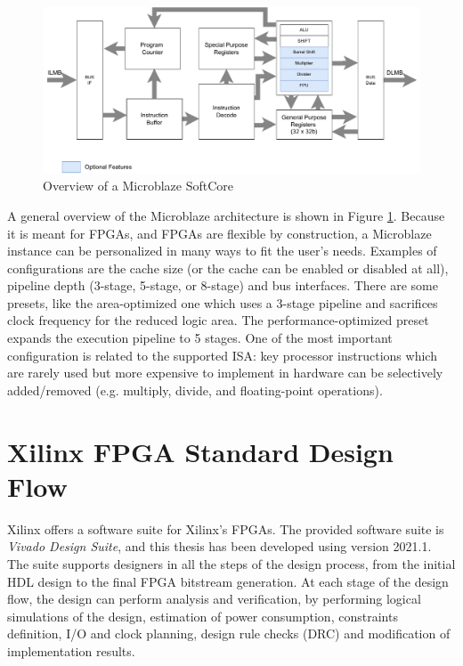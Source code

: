 \begin{figure}[H]
\centering
\includegraphics[width=0.8\linewidth]{images/chapter3/ublaze_arch.pdf}
\caption{\cite{anemaet2003microprocessor}Overview of a Microblaze SoftCore}
\label{fig:ublaze}
\end{figure}

A general overview of the Microblaze architecture is shown in Figure \ref{fig:ublaze}. Because it is meant for FPGAs, and FPGAs are flexible by construction, a Microblaze instance can be personalized in many ways to fit the user's needs. Examples of configurations are the cache size (or the cache can be enabled or disabled at all), pipeline depth (3-stage, 5-stage, or 8-stage) and bus interfaces. There are some presets, like the area-optimized one which uses a 3-stage pipeline and sacrifices clock frequency for the reduced logic area. The performance-optimized preset expands the execution pipeline to 5 stages. One of the most important configuration is related to the supported ISA: key processor instructions which are rarely used but more expensive to implement in hardware can be selectively added/removed (e.g. multiply, divide, and floating-point operations).

\section{Xilinx FPGA Standard Design Flow}

Xilinx offers a software suite for Xilinx's FPGAs. The provided software suite is \textit{Vivado Design Suite}, and this thesis has been developed using version 2021.1. The suite supports designers in all the steps of the design process, from the initial HDL design to the final FPGA bitstream generation. At each stage of the design flow, the design can perform analysis and verification, by performing logical simulations of the design, estimation of power consumption, constraints definition, I/O and clock planning, design rule checks (DRC) and modification of implementation results.\bigskip

